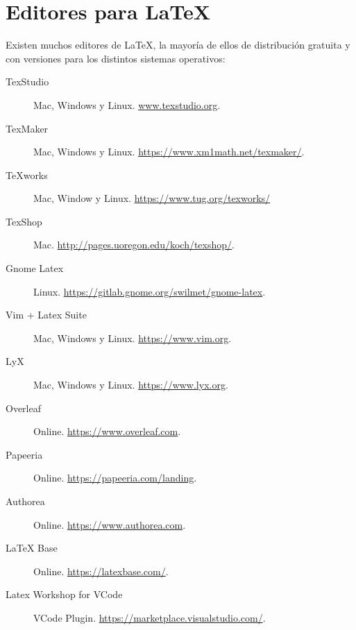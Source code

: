 \section{Editores para \LaTeX}
Existen muchos editores de \LaTeX, la mayoría de ellos de distribución gratuita y con versiones para los distintos sistemas operativos:
\begin{description}
    \item [TexStudio] Mac, Windows y Linux. \href{www.texstudio.org}{www.texstudio.org}.
    \item [TexMaker] Mac, Windows y Linux.  \href{https://www.xm1math.net/texmaker/}{https://www.xm1math.net/texmaker/}.
    \item[TeXworks] Mac, Window y Linux. \href{https://www.tug.org/texworks/}{https://www.tug.org/texworks/}
    \item [TexShop] Mac. \href{http://pages.uoregon.edu/koch/texshop/}{http://pages.uoregon.edu/koch/texshop/}.
    \item[Gnome Latex] Linux. \href{https://gitlab.gnome.org/swilmet/gnome-latex}{https://gitlab.gnome.org/swilmet/gnome-latex}.
    \item [Vim + Latex Suite] Mac, Windows y Linux. \href{https://www.vim.org}{https://www.vim.org}.
    \item [LyX] Mac, Windows y Linux. \href{https://www.lyx.org}{https://www.lyx.org}.
    \item [Overleaf] Online. \href{https://www.overleaf.com}{https://www.overleaf.com}.
    \item [Papeeria] Online. \href{https://papeeria.com/landing}{https://papeeria.com/landing}.
    \item [Authorea] Online. \href{https://www.authorea.com}{https://www.authorea.com}.
    \item [\LaTeX{} Base] Online. \href{https://latexbase.com/}{https://latexbase.com/}.
    \item [Latex Workshop for VCode] VCode Plugin. \href{https://marketplace.visualstudio.com/items?itemName=James-Yu.latex-workshop}{https://marketplace.visualstudio.com/}.
\end{description}
